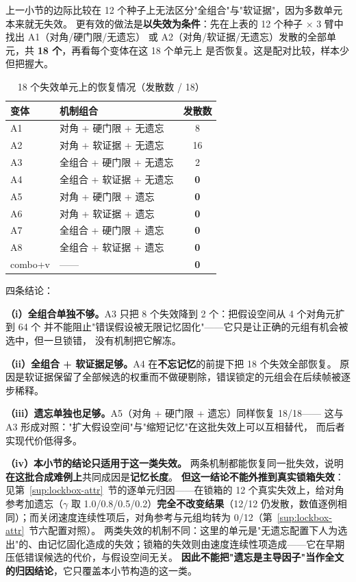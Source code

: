 \documentclass[UTF8,a4paper,zihao=-4]{ctexart}
\begin{document}
上一小节的边际比较在 12 个种子上无法区分"全组合"与"软证据"，因为多数单元本来就无失效。
更有效的做法是\textbf{以失效为条件}：先在上表的 12 个种子 × 3 臂中找出 A1（对角/硬门限/无遗忘）
或 A2（对角/软证据/无遗忘）发散的全部单元，共 \textbf{18 个}，再看每个变体在这 18 个单元上
是否恢复。这是配对比较，样本少但把握大。

\begin{table}[htbp]\centering\small
\caption{18 个失效单元上的恢复情况（发散数 / 18）}\label{tab:abl-hard}
\begin{tabular}{@{}llc@{}}\toprule
变体 & 机制组合 & 发散数 \\ \midrule
A1 & 对角 + 硬门限 + 无遗忘 & 8 \\
A2 & 对角 + 软证据 + 无遗忘 & 16 \\
A3 & 全组合 + 硬门限 + 无遗忘 & 2 \\
A4 & 全组合 + 软证据 + 无遗忘 & \textbf{0} \\
A5 & 对角 + 硬门限 + 遗忘 & \textbf{0} \\
A6 & 对角 + 软证据 + 遗忘 & \textbf{0} \\
A7 & 全组合 + 硬门限 + 遗忘 & \textbf{0} \\
A8 & 全组合 + 软证据 + 遗忘 & \textbf{0} \\
combo+v & —— & \textbf{0} \\
\bottomrule\end{tabular}\end{table}

四条结论：

\textbf{（i）全组合单独不够。}A3 只把 8 个失效降到 2 个：把假设空间从 4 个对角元扩到 64 个
并不能阻止"错误假设被无限记忆固化"——它只是让正确的元组有机会被选中，但一旦锁错，
没有机制把它解冻。

\textbf{（ii）全组合 + 软证据足够。}A4 在\textbf{不忘记忆}的前提下把 18 个失效全部恢复。
原因是软证据保留了全部候选的权重而不做硬剔除，错误锁定的元组会在后续帧被逐步稀释。

\textbf{（iii）遗忘单独也足够。}A5（对角 + 硬门限 + 遗忘）同样恢复 18/18——
这与 A3 形成对照："扩大假设空间"与"缩短记忆"在这批失效上可以互相替代，
而后者实现代价低得多。

\textbf{（iv）本小节的结论只适用于这一类失效。}
两条机制都能恢复同一批失效，说明\textbf{在这批合成难例上}共同成因是\textbf{记忆长度}。
\textbf{但这一结论不能外推到真实锁箱失效}：见第~\ref{sup:lockbox-attr}~节的逐单元归因——在锁箱的 12 个真实失效上，给对角参考加遗忘（$\gamma$ 取 1.0/0.8/0.5/0.2）\textbf{完全不改变结果}（12/12 仍发散，数值逐例相同）；而关闭速度连续性项后，对角参考与元组均转为 0/12（第~\ref{sup:lockbox-attr}~节六配置对照）。
两类失效的机制不同：这里的单元是"无遗忘配置下人为选出"的、由记忆固化造成的失效；锁箱的失效则由速度连续性项造成——它在早期压低错误候选的代价，与假设空间无关。
\textbf{因此不能把"遗忘是主导因子"当作全文的归因结论}，它只覆盖本小节构造的这一类。
\end{document}
